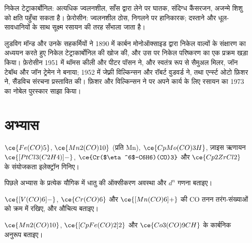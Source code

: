 \begin{safety}{}
निकेल टेट्राकार्बोनिल: अत्यधिक ज्वलनशील, साँस द्वारा लेने पर घातक, संदिग्ध कैंसरजन,
अजन्मे शिशु को क्षति पहुँचा सकता है। फ़ेरोसीन: ज्वलनशील ठोस, निगलने पर हानिकारक;
दस्ताने और धूल-सावधानियों के साथ सूक्ष्म रसायन की तरह सँभाला जाता है।
\end{safety}

\begin{history}[मॉन्ड का कार्बोनिल और सैंडविच]
लुडविग मॉन्ड और उनके सहकर्मियों ने 1890 में कार्बन मोनोऑक्साइड द्वारा निकेल वाल्वों के
संक्षारण का अध्ययन करते हुए निकेल टेट्राकार्बोनिल की खोज की, और उस पर निकेल
परिष्करण का एक प्रक्रम खड़ा किया। फ़ेरोसीन 1951 में थॉमस कीली और पीटर
पॉसन ने, और स्वतंत्र रूप से सैमुअल मिलर, जॉन टेबॉथ और जॉन ट्रेमेन ने बनाया; 1952 में
जेफ़्री विल्किन्सन और रॉबर्ट वुडवर्ड ने, तथा एर्न्स्ट ओटो फ़िशर ने,
सैंडविच संरचना प्रस्तावित की। फ़िशर और विल्किन्सन ने  पर अपने कार्य के लिए
रसायन का 1973 का नोबेल पुरस्कार साझा किया।
\end{history}

\section{अभ्यास}

\begin{exercise}[$\star$]\label{exo:b3:organometallic-bonding:1}
$\ce{Fe(CO)5}$, $\ce{Mn2(CO)10}$ (प्रति Mn), $\ce{CpMo(CO)3H}$, ज़ाइस ऋणायन
$\ce{[PtCl3(C2H4)]-}$, $\ce{Cr($\eta^6$-C6H6)(CO)3}$ और $\ce{Cp2ZrCl2}$ के संयोजकता इलेक्ट्रॉन गिनिए।
\end{exercise}

\begin{exercise}[$\star$]\label{exo:b3:organometallic-bonding:2}
पिछले अभ्यास के प्रत्येक यौगिक में धातु की ऑक्सीकरण अवस्था और $d^n$ गणना
बताइए।
\end{exercise}

\begin{exercise}[$\star$]\label{exo:b3:organometallic-bonding:3}
$\ce{[V(CO)6]-}$, $\ce{Cr(CO)6}$ और $\ce{[Mn(CO)6]+}$ की CO तनन तरंग-संख्याओं को क्रम में रखिए, और औचित्य बताइए।
\end{exercise}

\begin{exercise}[$\star$]\label{exo:b3:organometallic-bonding:4}
$\ce{Mn2(CO)10}$, $\ce{[CpFe(CO)2]2}$ और $\ce{Co3(CO)9CH}$ के कार्बनिक  अनुरूप बताइए।
\end{exercise}

